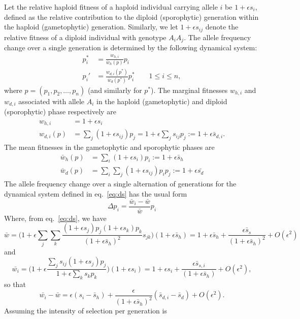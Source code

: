 \documentclass[
  11pt,
]{article}
\begin{document}
Let the relative haploid fitness of a haploid individual carrying allele
\(i\) be \(1 + \epsilon s_i\), defined as the relative contribution to
the diploid (sporophytic) generation within the haploid (gametophytic)
generation. Similarly, we let \(1+\epsilon s_{ij}\) denote the relative
fitness of a diploid individual with genotype \(A_i A_j\). The allele
frequency change over a single generation is determined by the following
dynamical system: \begin{align}
  p_i^\ast &= \frac{w_{h,i}}{\bar{w}_{h}(p)} p_i \nonumber \\
  p_i' &= \frac{w_{d,i}(p^\ast)}{\bar{w}_d(p^\ast)}p_i^\ast \qquad 1 \le i \le n,
  \label{eq:ds}
\end{align} where \(p = (p_1, p_2, \dots, p_n)\) (and similarly for
\(p^\ast\)). The marginal fitnesses \(w_{h,i}\) and \(w_{d,i}\)
associated with allele \(A_i\) in the haploid (gametophytic) and diploid
(sporophytic) phase respectively are \begin{align*}
  w_{h,i} &= 1 + \epsilon s_i \\
  w_{d,i}(p) &= \sum_j (1+\epsilon s_{ij})p_j = 1 + \epsilon\sum_j s_{ij}p_j := 1 +
  \epsilon\bar{s}_{d,i}.
\end{align*} The mean fitnesses in the gametophytic and sporophytic
phases are \begin{align*}
  \bar{w}_h(p) &= \sum_i (1+\epsilon s_i)p_i := 1 + \epsilon\bar{s}_h \\
  \bar{w}_d(p) &= \sum_i \sum_j (1+\epsilon s_{ij})p_ip_j := 1 + \epsilon\bar{s_d}
\end{align*} The allele frequency change over a single alternation of
generations for the dynamical system defined in eq.~\ref{eq:ds} has the
usual form \begin{equation}
  \Delta p_i = \frac{\bar{w}_i - \bar{w}}{\bar{w}} p_i
  \label{eq:change}
  \end{equation} Where, from eq.~\ref{eq:ds}, we have \begin{equation}
  \bar{w} = \Big(1 + \epsilon \sum_j \sum_k
  \frac{(1+\epsilon s_j)p_j (1+\epsilon s_k)p_k}{(1+\epsilon\bar{s}_h)^2} s_{jk}\Big) 
  (1+\epsilon\bar{s}_h) = 
  1 + \epsilon\bar{s}_h + \frac{\epsilon\bar{s}_s}{(1+\epsilon \bar{s}_h)^2} +
    O(\epsilon^2)
  \label{eq:wm}
\end{equation} and \[
  \bar{w_i} = \Big(1 + \epsilon
    \frac{\sum_j s_{ij}(1+\epsilon s_j)p_j}{1+\epsilon\sum_k s_k p_k}\Big)
    (1+\epsilon s_i)
  = 1 + \epsilon s_i
  + \frac{\epsilon\bar{s}_{s,i}}{(1 + \epsilon\bar{s}_h)}+
    O(\epsilon^2),
  \] so that \begin{equation}
  \bar{w_i} - \bar{w}
  = \epsilon (s_i - \bar{s}_h)
  + \frac{\epsilon}{(1 + \epsilon \bar{s}_h)^2} (\bar{s}_{d,i} - \bar{s}_d)
  + O(\epsilon^2).
  \label{eq:diff}
  \end{equation} Assuming the intensity of selection per generation is
\end{document}
